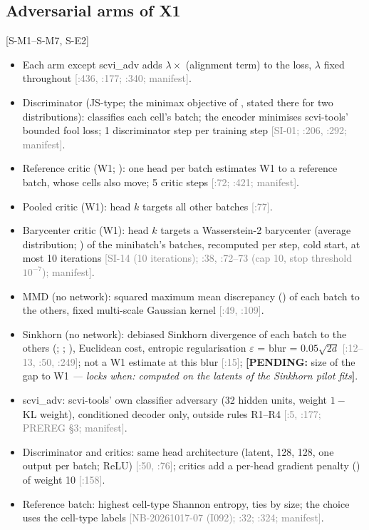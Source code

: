 \documentclass[11pt]{article}
\newcommand{\src}[1]{{\scriptsize\textcolor{gray}{[#1]}}}
\newcommand{\pending}[2]{{\color{BurntOrange}\textbf{[PENDING:} #1 \textit{--- locks when: #2}\textbf{]}}}
\begin{document}
\subsection{Adversarial arms of X1}
[S-M1--S-M7, S-E2]
\begin{itemize}
\item Each arm except scvi\_adv adds $\lambda \times$ (alignment term) to the loss, $\lambda$ fixed throughout \src{:436, :177; \file{fit_paper_config.py}:340; manifest}.
\item Discriminator (JS-type; the minimax objective of \citealp{goodfellow2014generative}, stated there for two distributions): classifies each cell's batch; the encoder minimises scvi-tools' bounded fool loss; 1 discriminator step per training step \src{SI-01; :206, :292; manifest}.
\item Reference critic (W1; \citealp{arjovsky2017wasserstein}): one head per batch estimates W1 to a reference batch, whose cells also move; 5 critic steps \src{:72; :421; manifest}.
\item Pooled critic (W1): head $k$ targets all other batches \src{:77}.
\item Barycenter critic (W1): head $k$ targets a Wasserstein-2 barycenter (average distribution; \citealp{cuturi2014fast}) of the minibatch's batches, recomputed per step, cold start, at most 10 iterations \src{SI-14 (10 iterations); :38, :72--73 (cap 10, stop threshold $10^{-7}$); manifest}.
\item MMD (no network): squared maximum mean discrepancy (\citealp{gretton2012kernel}) of each batch to the others, fixed multi-scale Gaussian kernel \src{:49, :109}.
\item Sinkhorn (no network): debiased Sinkhorn divergence of each batch to the others (\citealp{cuturi2013sinkhorn}; \citealp{genevay2018learning}; \citealp{feydy2019interpolating}), Euclidean cost, entropic regularisation $\varepsilon$ = blur = $0.05\sqrt{2d}$ \src{:12--13, :50, :249}; not a W1 estimate at this blur \src{:15}; \pending{size of the gap to W1}{computed on the latents of the Sinkhorn pilot fits}.
\item scvi\_adv: scvi-tools' own classifier adversary (32 hidden units, weight $1 -$ KL weight), conditioned decoder only, outside rules R1--R4 \src{:5, :177; PREREG \S3; manifest}.
\item Discriminator and critics: same head architecture (latent, 128, 128, one output per batch; ReLU) \src{:50, :76}; critics add a per-head gradient penalty (\citealp{gulrajani2017improved}) of weight 10 \src{:158}.
\item Reference batch: highest cell-type Shannon entropy, ties by size; the choice uses the cell-type labels \src{NB-20261017-07 (I092); :32; \file{fit_paper_config.py}:324; manifest}.
\end{itemize}
\end{document}
